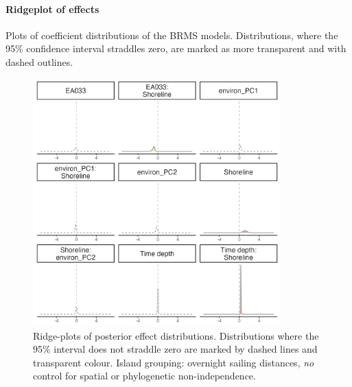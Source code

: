 \documentclass[unnumsec,webpdf,modern,medium]{oup-authoring-template}
\begin{document}
\FloatBarrier
\paragraph{Ridgeplot of effects}
\label{appendix_supp_figs_ridges}
Plots of coefficient distributions of the BRMS models. Distributions, where the 95\% confidence interval straddles zero, are marked as more transparent and with dashed outlines.

\begin{figure}[ht]
\includegraphics[width=0.85\textwidth]{brms_SBZR_control_none_group_full_effect_ridge_panels_plot.png}
\caption{Ridge-plots of posterior effect distributions. Distributions where the 95\% interval does not straddle zero are marked by dashed lines and transparent colour. Island grouping: overnight sailing distances, \emph{no} control for spatial or phylogenetic non-independence.}
\label{brms_SBZR_control_none_group_full_effect_ridge_panels_plot}
\end{figure}
\end{document}
